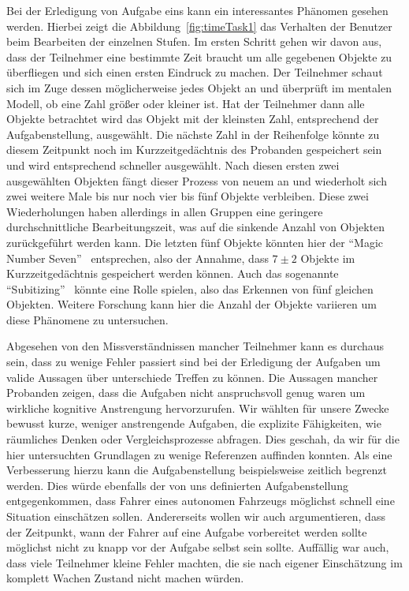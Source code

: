Bei der Erledigung von Aufgabe eins kann ein interessantes Phänomen gesehen werden. Hierbei zeigt die Abbildung~\ref{fig:timeTask1} das Verhalten der Benutzer beim Bearbeiten der einzelnen Stufen. 
Im ersten Schritt gehen wir davon aus, dass der Teilnehmer eine bestimmte Zeit braucht um alle gegebenen Objekte zu überfliegen und sich einen ersten Eindruck zu machen. 
Der Teilnehmer schaut sich im Zuge dessen möglicherweise jedes Objekt an und überprüft im mentalen Modell, ob eine Zahl größer oder kleiner ist. 
Hat der Teilnehmer dann alle Objekte betrachtet wird das Objekt mit der kleinsten Zahl, entsprechend der Aufgabenstellung, ausgewählt. 
Die nächste Zahl in der Reihenfolge könnte zu diesem Zeitpunkt noch im Kurzzeitgedächtnis des Probanden gespeichert sein und wird entsprechend schneller ausgewählt. 
Nach diesen ersten zwei ausgewählten Objekten fängt dieser Prozess von neuem an und wiederholt sich zwei weitere Male bis nur noch vier bis fünf Objekte verbleiben. 
Diese zwei Wiederholungen haben allerdings in allen Gruppen eine geringere durchschnittliche Bearbeitungszeit, was auf die sinkende  Anzahl von Objekten zurückgeführt werden kann.
Die letzten fünf Objekte könnten hier der "`Magic Number Seven"'~\cite{saaty2003magic} entsprechen, also der Annahme, dass $7\pm 2$ Objekte im Kurzzeitgedächtnis gespeichert werden können.
Auch das sogenannte "`Subitizing"'~\cite{mandler1982subitizing} könnte eine Rolle spielen, also das Erkennen von fünf gleichen Objekten.
Weitere Forschung kann hier die Anzahl der Objekte variieren um diese Phänomene zu untersuchen.

Abgesehen von den Missverständnissen mancher Teilnehmer kann es durchaus sein, dass zu wenige Fehler passiert sind bei der Erledigung der Aufgaben um valide Aussagen über unterschiede Treffen zu können.
Die Aussagen mancher Probanden zeigen, dass die Aufgaben nicht anspruchsvoll genug waren um wirkliche kognitive Anstrengung hervorzurufen. 
Wir wählten für unsere Zwecke bewusst kurze, weniger anstrengende Aufgaben, die explizite Fähigkeiten, wie räumliches Denken oder Vergleichsprozesse abfragen. Dies geschah, da wir für die hier untersuchten Grundlagen zu wenige Referenzen auffinden konnten. 
Als eine Verbesserung hierzu kann die Aufgabenstellung beispielsweise zeitlich begrenzt werden. Dies würde ebenfalls der von uns definierten Aufgabenstellung entgegenkommen, dass Fahrer eines autonomen Fahrzeugs möglichst schnell eine Situation einschätzen sollen. Andererseits wollen wir auch argumentieren, dass der Zeitpunkt, wann der Fahrer auf eine Aufgabe vorbereitet werden sollte möglichst nicht zu knapp vor der Aufgabe selbst sein sollte. 
Auffällig war auch, dass viele Teilnehmer kleine Fehler machten, die sie nach eigener Einschätzung im komplett Wachen Zustand nicht machen würden. 

